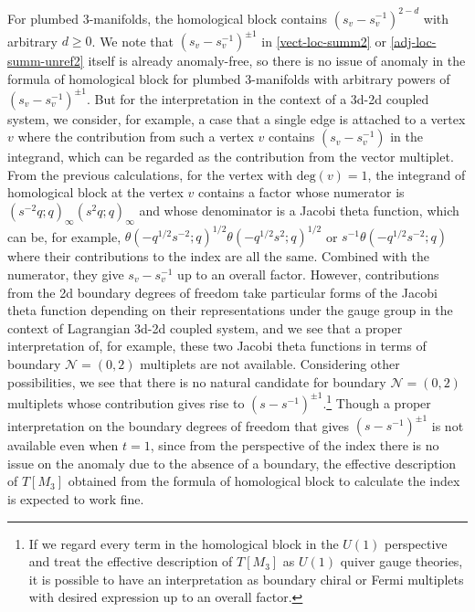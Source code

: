 \documentclass[11pt,hyper,a4paper]{article}
\begin{document}
For plumbed 3-manifolds, the homological block contains $(s_v-s_v^{-1})^{2-d}$ with arbitrary $d \geq 0$.
We note that $(s_v-s_v^{-1})^{\pm1}$ in \eqref{vect-loc-summ2} or \eqref{adj-loc-summ-unref2} itself is already anomaly-free, so there is no issue of anomaly in the formula of homological block for plumbed 3-manifolds with arbitrary powers of $(s_v-s_v^{-1})^{\pm1}$.
But for the interpretation in the context of a 3d-2d coupled system, we consider, for example, a case that a single edge is attached to a vertex $v$ where the contribution from such a vertex $v$ contains $(s_v-s_v^{-1})$ in the integrand, which can be regarded as the contribution from the vector multiplet.
From the previous calculations, for the vertex with $\text{deg}(v)=1$, the integrand of homological block at the vertex $v$ contains a factor whose numerator is $(s^{-2} q;q)_\infty (s^{2} q;q)_\infty$ and whose denominator is a Jacobi theta function, which can be, for example, $\theta(-q^{1/2} s^{-2};q)^{1/2} \theta(-q^{1/2} s^{2};q)^{1/2}$ or $s^{-1} \theta(-q^{1/2} s^{-2};q)$ where their contributions to the index are all the same.
Combined with the numerator, they give $s_v-s_v^{-1}$ up to an overall factor.
However, contributions from the 2d boundary degrees of freedom take particular forms of the Jacobi theta function depending on their representations under the gauge group in the context of Lagrangian 3d-2d coupled system, and we see that a proper interpretation of, for example, these two Jacobi theta functions in terms of boundary $\mathcal{N}=(0,2)$ multiplets are not available. 
Considering other possibilities, we see that there is no natural candidate for boundary $\mathcal{N}=(0,2)$ multiplets whose contribution gives rise to $(s-s^{-1})^{\pm1}$.\footnote{If we regard every term in the homological block in the $U(1)$ perspective and treat the effective description of $T[M_3]$ as $U(1)$ quiver gauge theories, it is possible to have an interpretation as boundary chiral or Fermi multiplets with desired expression up to an overall factor.}
Though a proper interpretation on the boundary degrees of freedom that gives $(s-s^{-1})^{\pm1}$ is not available even when $t=1$, since from the perspective of the index there is no issue on the anomaly due to the absence of a boundary, the effective description of $T[M_3]$ obtained from the formula of homological block to calculate the index is expected to work fine.
\end{document}
